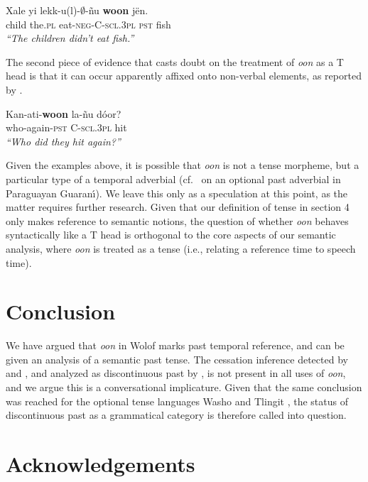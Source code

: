 \documentclass[output=paper,newtxmath,modfonts,nonflat,draftmode]{langsci/langscibook}
\begin{document}
\ea
\gll Xale yi lekk-{u(l)}-$\emptyset$-\~nu \textbf{woon} j\"en.\\
child the.\textsc{pl} eat-\textsc{neg-C-scl.3pl} \textsc{pst} fish\\
\glt \textit{``The children didn't eat fish.''}\label{ex:bochnak:neg}
\z


The second piece of evidence that casts doubt on the treatment of 
\textit{oon} as a T head is that it can occur apparently affixed onto
non-verbal elements, as reported by \cite{torrence12clause}. 

\ea
\gll Kan-ati-\textbf{woon} la-\~nu d\'oor?\\
who-again-\textsc{pst} C-\textsc{scl.3pl} hit\\
\glt \textit{``Who did they hit again?''}\hfill\citep[p.24]{torrence12clause}
\z

Given the examples above, it is possible that \textit{oon} is not a
tense morpheme, but a particular type of a temporal adverbial (cf.~\citealt{tonhauser06temporal} on an optional past adverbial in Paraguayan Guaran\'\i). We
leave this only as a speculation at this point, as the matter requires
further research. Given that our definition of tense in section 4 only makes reference to semantic notions, the question of whether \textit{oon} behaves syntactically like a T head is orthogonal to the core aspects of our semantic analysis, where \textit{oon} is treated as a tense (i.e., relating a reference time to speech time).


\section{Conclusion}

We have argued that \textit{oon} in Wolof marks past temporal reference, and can be given an analysis of a semantic past tense. The cessation inference detected by \citet{church81systeme} and
\citet{robert91approche}, and analyzed as discontinuous past by
\citet{Plungian2006}, is not present in all uses of \textit{oon},
and we argue this is a conversational implicature. Given that the same conclusion was reached for the optional tense languages Washo \citep{bochnak16past} and Tlingit \citep{cable16implicatures}, the status of discontinuous past as a grammatical category is therefore called into question. 






\section*{Acknowledgements}
\end{document}

